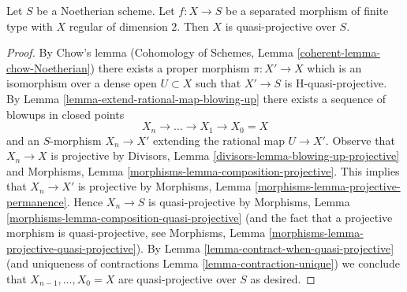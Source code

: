 \begin{lemma}
\label{lemma-regular-dim-2-quasi-projective}
Let $S$ be a Noetherian scheme. Let $f : X \to S$ be a
separated morphism of finite type with $X$ regular of dimension $2$.
Then $X$ is quasi-projective over $S$.
\end{lemma}

\begin{proof}
By Chow's lemma
(Cohomology of Schemes, Lemma \ref{coherent-lemma-chow-Noetherian})
there exists a proper morphism $\pi : X' \to X$ which is an isomorphism
over a dense open $U \subset X$ such that $X' \to S$ is H-quasi-projective.
By Lemma \ref{lemma-extend-rational-map-blowing-up}
there exists a sequence of blowups in closed points
$$
X_n \to \ldots \to X_1 \to X_0 = X
$$
and an $S$-morphism $X_n \to X'$ extending the rational map $U \to X'$.
Observe that $X_n \to X$ is projective by
Divisors, Lemma \ref{divisors-lemma-blowing-up-projective} and
Morphisms, Lemma \ref{morphisms-lemma-composition-projective}.
This implies that $X_n \to X'$ is projective by
Morphisms, Lemma \ref{morphisms-lemma-projective-permanence}.
Hence $X_n \to S$ is quasi-projective by
Morphisms, Lemma \ref{morphisms-lemma-composition-quasi-projective}
(and the fact that a projective morphism is quasi-projective, see
Morphisms, Lemma \ref{morphisms-lemma-projective-quasi-projective}).
By Lemma \ref{lemma-contract-when-quasi-projective}
(and uniqueness of contractions Lemma \ref{lemma-contraction-unique})
we conclude  that $X_{n - 1}, \ldots, X_0 = X$ are quasi-projective over $S$
as desired.
\end{proof}













